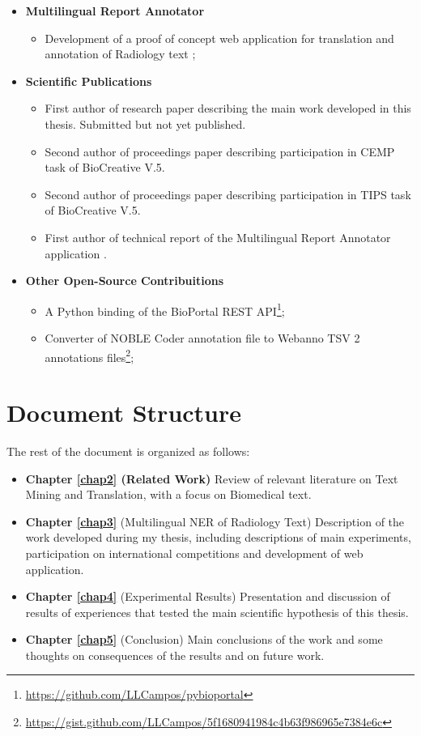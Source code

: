 \begin{itemize}
\item \textbf{Multilingual Report Annotator}
\begin{itemize}
	\item Development of a proof of concept web application for translation and annotation of Radiology text \citep{Campos2017};
\end{itemize}
	
\item \textbf{Scientific Publications}
	\begin{itemize}
		\item First author of research paper describing the main work developed in this thesis. Submitted but not yet published.
		\item Second author of proceedings paper describing participation in CEMP task of BioCreative V.5.
		\item Second author of proceedings paper describing participation in TIPS task of BioCreative V.5.	
		\item First author of technical report of the Multilingual Report Annotator application \citep{Campos2017}.
	\end{itemize}
	
\item \textbf{Other Open-Source Contribuitions}
	\begin{itemize}
		\item A Python binding of the BioPortal REST API\footnote{\url{https://github.com/LLCampos/pybioportal}};
		\item Converter of NOBLE Coder annotation file to Webanno TSV 2 annotations files\footnote{\url{https://gist.github.com/LLCampos/5f1680941984c4b63f986965e7384e6c}};
	\end{itemize}

	 
\end{itemize}

\section{Document Structure}
The rest of the document is organized as follows:
\begin{itemize}
	\item \textbf{Chapter \ref{chap2} (Related Work)} Review of relevant literature on Text Mining and Translation, with a focus on Biomedical text.
	\item \textbf{Chapter \ref{chap3}} (Multilingual NER of Radiology Text) Description of the work developed during my thesis, including descriptions of main experiments, participation on international competitions and development of web application.
	\item \textbf{Chapter \ref{chap4}} (Experimental Results) Presentation and discussion of results of experiences that tested the main scientific hypothesis of this thesis.
	\item \textbf{Chapter \ref{chap5}} (Conclusion) Main conclusions of the work and some thoughts on consequences of the results and on future work.
\end{itemize}



